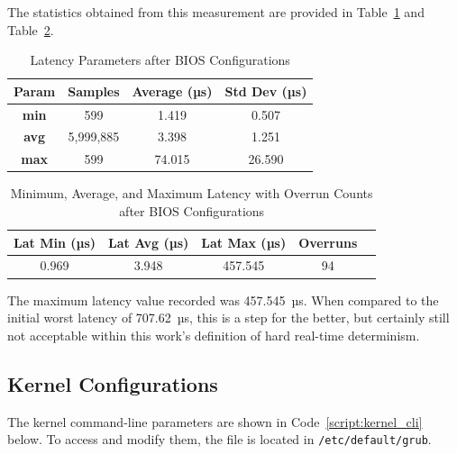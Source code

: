 \documentclass[MMR,Master,english]{style/twbook}
\begin{document}
\noindent The statistics obtained from this measurement are provided in Table~\ref{tab:latency_stats_virt_bios} and Table~\ref{tab:latency_overrun_msw_new_virt_bios}.

\begin{table}[H]
	\centering
	\caption{Latency Parameters after BIOS Configurations}
	\label{tab:latency_stats_virt_bios}
	\begin{tabular}{|c|c|c|c|}
		\hline
		\textbf{Param} & \textbf{Samples} & \textbf{Average (µs)} & \textbf{Std Dev (µs)} \\ \hline
		\textbf{min}   & 599              & 1.419                 & 0.507                 \\ \hline
		\textbf{avg}   & 5,999,885        & 3.398                 & 1.251                 \\ \hline
		\textbf{max}   & 599              & 74.015                & 26.590                \\ \hline
	\end{tabular}
\end{table}

\begin{table}[H]
	\centering
	\caption[Latency Statistics with Overrun Counts after BIOS Configurations]{Minimum, Average, and Maximum Latency with Overrun Counts after BIOS Configurations}
	\label{tab:latency_overrun_msw_new_virt_bios}
	\begin{tabular}{|c|c|c|c|c|}
		\hline
		\textbf{Lat Min (µs)} & \textbf{Lat Avg (µs)} & \textbf{Lat Max (µs)} & \textbf{Overruns} \\ \hline
		0.969                 & 3.948                 & 457.545               & 94                \\ \hline
	\end{tabular}
\end{table}

\noindent The maximum latency value recorded was 457.545~µs. When compared to the initial worst latency of 707.62~µs, this is a step for the better, but certainly still not acceptable within this work's definition of hard real-time determinism.

\subsection{Kernel Configurations}\label{subsec:kernel_configurations}
The kernel command-line parameters are shown in Code~\ref{script:kernel_cli} below. To access and modify them, the file is located in \texttt{/etc/default/grub}.
\end{document}
